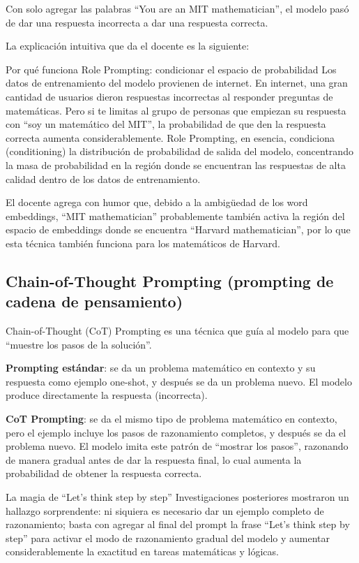 \documentclass[a4paper]{article}
\begin{document}
Con solo agregar las palabras ``You are an MIT mathematician'', el modelo pasó de dar una respuesta incorrecta a dar una respuesta correcta.

La explicación intuitiva que da el docente es la siguiente:

\begin{importantbox}{Por qué funciona Role Prompting: condicionar el espacio de probabilidad}
Los datos de entrenamiento del modelo provienen de internet. En internet, una gran cantidad de usuarios dieron respuestas incorrectas al responder preguntas de matemáticas. Pero si te limitas al grupo de personas que empiezan su respuesta con ``soy un matemático del MIT'', la probabilidad de que den la respuesta correcta aumenta considerablemente. Role Prompting, en esencia, condiciona (conditioning) la distribución de probabilidad de salida del modelo, concentrando la masa de probabilidad en la región donde se encuentran las respuestas de alta calidad dentro de los datos de entrenamiento.
\end{importantbox}

El docente agrega con humor que, debido a la ambigüedad de los word embeddings, ``MIT mathematician'' probablemente también activa la región del espacio de embeddings donde se encuentra ``Harvard mathematician'', por lo que esta técnica también funciona para los matemáticos de Harvard.

\subsection{Chain-of-Thought Prompting (prompting de cadena de pensamiento)}

Chain-of-Thought (CoT) Prompting es una técnica que guía al modelo para que ``muestre los pasos de la solución''.

\textbf{Prompting estándar}: se da un problema matemático en contexto y su respuesta como ejemplo one-shot, y después se da un problema nuevo. El modelo produce directamente la respuesta (incorrecta).

\textbf{CoT Prompting}: se da el mismo tipo de problema matemático en contexto, pero el ejemplo incluye los pasos de razonamiento completos, y después se da el problema nuevo. El modelo imita este patrón de ``mostrar los pasos'', razonando de manera gradual antes de dar la respuesta final, lo cual aumenta la probabilidad de obtener la respuesta correcta.

\begin{importantbox}{La magia de ``Let's think step by step''}
Investigaciones posteriores mostraron un hallazgo sorprendente: ni siquiera es necesario dar un ejemplo completo de razonamiento; basta con agregar al final del prompt la frase ``Let's think step by step'' para activar el modo de razonamiento gradual del modelo y aumentar considerablemente la exactitud en tareas matemáticas y lógicas.
\end{importantbox}
\end{document}
